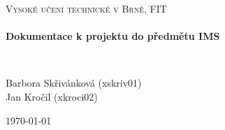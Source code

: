 \begin{titlepage}
\begin{center}

\textsc{\LARGE Vysoké učení technické v Brně, FIT}\\[3cm]

\HRule \\[0.4cm]
{ \huge \bfseries Dokumentace k projektu do předmětu IMS \\[0.4cm] }

\HRule \\[3cm]

\begin{minipage}{1.0\textwidth}
\begin{flushleft} \large
Barbora Skřivánková (xskriv01) \\
Jan Kročil (xkroci02)
\end{flushleft}
\end{minipage}


\vfill

{\large \today}

\end{center}
\end{titlepage}
